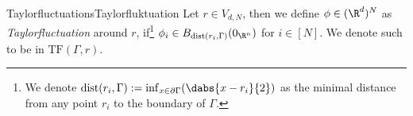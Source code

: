 \begin{mdef}{Taylorfluctuations}{Taylorfluktuation}
    Let $r\in V_{d,N}$, then we define $\phi\in(\R^d)^N$ as \emph{Taylorfluctuation} around $r$, if\footnote{We denote $\text{dist}(r_i,\Gamma):=\inf_{x\in\partial\Gamma}(\dabs{x - r_i}{2})$ as the minimal distance from any point $r_i$ to the boundary of $\Gamma$.} $\phi_i\in B_{\text{dist}(r_i,\Gamma)}(0_{\R^n})$ for $i\in[N]$. We denote such to be in $\text{TF}(\Gamma,r)$. 
\end{mdef}